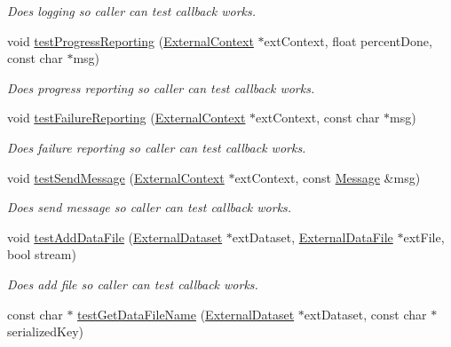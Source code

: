 \begin{DoxyCompactItemize}
\begin{DoxyCompactList}\small\item\em Does logging so caller can test callback works. \item\end{DoxyCompactList}\item 
void \hyperlink{classBUSBOY_1_1ExternalEntry_aa8fc3616365460f27b4fdd47eba96672}{testProgressReporting} (\hyperlink{classBUSBOY_1_1ExternalContext}{ExternalContext} $\ast$extContext, float percentDone, const char $\ast$msg)
\begin{DoxyCompactList}\small\item\em Does progress reporting so caller can test callback works. \item\end{DoxyCompactList}\item 
void \hyperlink{classBUSBOY_1_1ExternalEntry_aeea4e324953906fce5a265c56fe3edc2}{testFailureReporting} (\hyperlink{classBUSBOY_1_1ExternalContext}{ExternalContext} $\ast$extContext, const char $\ast$msg)
\begin{DoxyCompactList}\small\item\em Does failure reporting so caller can test callback works. \item\end{DoxyCompactList}\item 
void \hyperlink{classBUSBOY_1_1ExternalEntry_a91bf31952208a10fd6ddc7b4a28b659a}{testSendMessage} (\hyperlink{classBUSBOY_1_1ExternalContext}{ExternalContext} $\ast$extContext, const \hyperlink{classBUSBOY_1_1Message}{Message} \&msg)
\begin{DoxyCompactList}\small\item\em Does send message so caller can test callback works. \item\end{DoxyCompactList}\item 
void \hyperlink{classBUSBOY_1_1ExternalEntry_a735cdf7fcbc7d961254b99f59aa735ee}{testAddDataFile} (\hyperlink{classBUSBOY_1_1ExternalDataset}{ExternalDataset} $\ast$extDataset, \hyperlink{classBUSBOY_1_1ExternalDataFile}{ExternalDataFile} $\ast$extFile, bool stream)
\begin{DoxyCompactList}\small\item\em Does add file so caller can test callback works. \item\end{DoxyCompactList}\item 
const char $\ast$ \hyperlink{classBUSBOY_1_1ExternalEntry_af28fbb5390f40892e2fce951a31d8d97}{testGetDataFileName} (\hyperlink{classBUSBOY_1_1ExternalDataset}{ExternalDataset} $\ast$extDataset, const char $\ast$serializedKey)

\end{DoxyCompactItemize}

